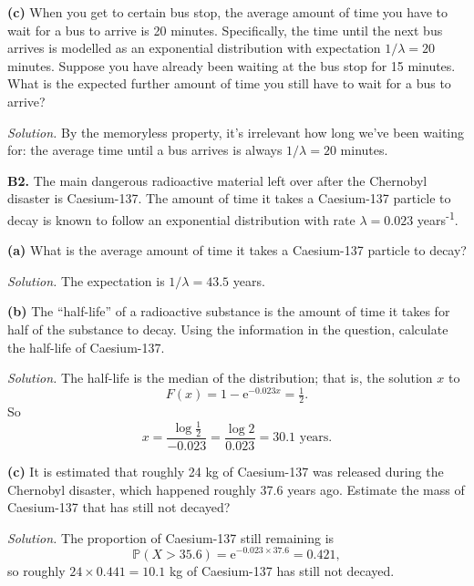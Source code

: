 \documentclass[
  a4paper,
]{book}
\theoremstyle{definition}
\theoremstyle{definition}
\theoremstyle{definition}
\theoremstyle{definition}
\theoremstyle{remark}
\begin{document}
\textbf{(c)} When you get to certain bus stop, the average amount of time you have to wait for a bus to arrive is 20 minutes. Specifically, the time until the next bus arrives is modelled as an exponential distribution with expectation \(1/\lambda = 20\) minutes. Suppose you have already been waiting at the bus stop for 15 minutes. What is the expected further amount of time you still have to wait for a bus to arrive?

\begin{myanswers}
\emph{Solution.}
By the memoryless property, it's irrelevant how long we've been waiting for: the average time until a bus arrives is always \(1/\lambda = 20\) minutes.

\end{myanswers}

\textbf{B2.} The main dangerous radioactive material left over after the Chernobyl disaster is Caesium-137. The amount of time it takes a Caesium-137 particle to decay is known to follow an exponential distribution with rate \(\lambda = 0.023\) years\textsuperscript{-1}.

\textbf{(a)} What is the average amount of time it takes a Caesium-137 particle to decay?

\begin{myanswers}
\emph{Solution.} The expectation is \(1/\lambda = 43.5\) years.

\end{myanswers}

\textbf{(b)} The ``half-life'' of a radioactive substance is the amount of time it takes for half of the substance to decay. Using the information in the question, calculate the half-life of Caesium-137.

\begin{myanswers}
\emph{Solution.} The half-life is the median of the distribution; that is, the solution \(x\) to
\[ F(x) = 1 - \mathrm{e}^{-0.023x} = \tfrac12 . \]
So
\[ x = \frac{\log\frac12}{-0.023} = \frac{\log 2}{0.023} = 30.1 \text{ years} . \]

\end{myanswers}

\textbf{(c)} It is estimated that roughly 24 kg of Caesium-137 was released during the Chernobyl disaster, which happened roughly 37.6 years ago. Estimate the mass of Caesium-137 that has still not decayed?

\begin{myanswers}
\emph{Solution.} The proportion of Caesium-137 still remaining is
\[ \mathbb P(X > 35.6) = \mathrm e^{-0.023 \times 37.6} = 0.421 , \]
so roughly \(24 \times 0.441 = 10.1\) kg of Caesium-137 has still not decayed.

\end{myanswers}
\end{document}
